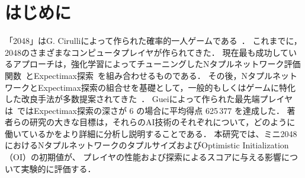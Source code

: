 \section{はじめに}
「2048」はG. Cirulliによって作られた確率的一人ゲームである~\cite{2048}．
これまでに，2048のさまざまなコンピュータプレイヤが作られてきた．
現在最も成功しているアプローチは，強化学習によってチューニングしたNタプルネットワーク評価関数~\cite{SzJa14}とExpectimax探索~\cite{YWHC16}を組み合わせるものである．
その後，NタプルネットワークとExpectimax探索の組合せを基礎として，一般的もしくはゲームに特化した改良手法が多数提案されてきた~\cite{YWHC16,Mats17,Jask17,GuCW22}．
Gueiによって作られた最先端プレイヤは~\cite{GuCW22}ではExpectimax探索の深さが 6 の場合に平均得点 625\,377 を達成した．
著者らの研究の大きな目標は，それらのAI技術のそれぞれについて，どのように働いているかをより詳細に分析し説明することである．
本研究では、ミニ2048におけるNタプルネットワークのタプルサイズおよびOptimistic Initialization（OI）の初期値が、
プレイヤの性能および探索によるスコアに与える影響について実験的に評価する．



